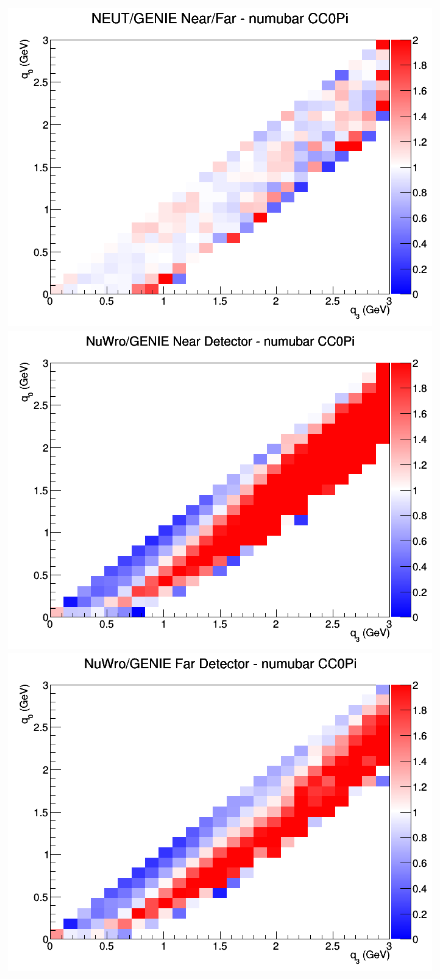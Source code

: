 \begin{figure}[h]
\endminipage
{}
\includegraphics[width=\linewidth]{q0_q3/nominal/ratios/CC0Pi_NEUT_GENIE_numubar_NF_q3_q0.png}
\endminipage
\newline
{}
\includegraphics[width=\linewidth]{q0_q3/nominal/ratios/CC0Pi_NuWro_GENIE_numubar_near_q3_q0.png}
\endminipage
{}
\includegraphics[width=\linewidth]{q0_q3/nominal/ratios/CC0Pi_NuWro_GENIE_numubar_far_q3_q0.png}

\end{figure}
